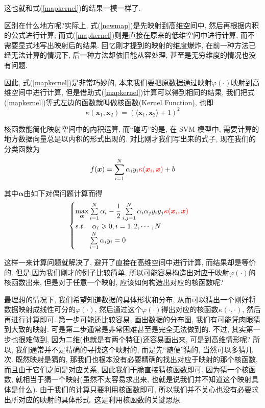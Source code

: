 \documentclass[a4paper,UTF8]{ctexart}
\theoremstyle{plain} \newtheorem{theorem}{定理}[section]
\theoremstyle{plain} \newtheorem{definition}{定义}[section]
\theoremstyle{plain} \newtheorem{lemma}{引理}[section]
\theoremstyle{plain} \newtheorem{proposition}{命题}[section]
\theoremstyle{plain} \newtheorem{example}{例}
\theoremstyle{plain} \newtheorem{remark}{注}
\theoremstyle{plain} \newtheorem{corollary}{推论}[section]
\begin{document}
这也就和式(\ref{mapkernel})的结果一模一样了.

区别在什么地方呢?实际上, 式(\ref{newmap})是先映射到高维空间中, 然后再根据内积的公式进行计算; 而式(\ref{mapkernel})则是直接在原来的低维空间中进行计算, 而不需要显式地写出映射后的结果. 回忆刚才提到的映射的维度爆炸, 在前一种方法已经无法计算的情况下, 后一种方法却依旧能从容处理, 甚至是无穷维度的情况也没有问题.

因此, 式(\ref{mapkernel})是非常巧妙的, 本来我们要把原数据通过映射$\varphi(\cdot)$映射到高维空间中进行计算, 但是借助式(\ref{mapkernel})计算可以得到相同的结果, 我们把式(\ref{mapkernel})等式左边的函数就叫做核函数(Kernel Function), 也即
\begin{equation*}
\kappa (\bm{x}_1,\bm{x}_2) = \left(\langle \bm{x}_1, \bm{x}_2 \rangle + 1 \right)^{2}
\end{equation*}

核函数能简化映射空间中的内积运算, 而“碰巧”的是, 在 SVM 模型中, 需要计算的地方数据向量总是以内积的形式出现的. 对比刚才我们写出来的式子, 现在我们的分类函数为
\begin{equation*}
f(\bm{x}) = \sum_{i=1}^{N} \alpha_{i} y_{i} {\color{red}\kappa (\bm{x}_{i},\bm{x})} + b
\end{equation*}

其中$\bm{\alpha}$由如下对偶问题计算而得
$$
\begin{cases}
\max\limits_{\bm{\alpha}}  \sum\limits_{i=1}^{N} \alpha_{i} - \dfrac{1}{2} \sum\limits_{i,j=1}^{N} \alpha_{i} \alpha_{j} y_{i} y_{j}  {\color{red}\kappa (\bm{x}_{i},\bm{x}) } \\ 
s.t. \quad \alpha_{i} \geqslant 0, i = 1,2,\cdots,N \\ 
\qquad \sum\limits_{i=1}^{N} \alpha_{i} y_{i} = 0
\end{cases}
$$

这样一来计算问题就解决了, 避开了直接在高维空间中进行计算, 而结果却是等价的. 但是,因为我们刚才的例子比较简单, 所以可能容易构造出对应于映射$\varphi(\cdot)$的核函数出来, 但是对于任意一个映射, 应该如何构造出对应的核函数呢?

最理想的情况下, 我们希望知道数据的具体形状和分布, 从而可以猜出一个刚好将数据映射成线性可分的$\varphi(\cdot)$, 然后通过这个$\varphi(\cdot)$得出对应的核函数$\kappa(\cdot,\cdot)$, 然后再进行计算即可. 第一步可能还比较容易, 画出数据的分布图, 我们有可能凭肉眼猜到大致的映射. 可是第二步通常是非常困难甚至是完全无法做到的. 不过, 其实第一步也很难做到, 因为二维(也就是有两个特征)还容易画出来, 可是到高维情形呢? 所以, 我们通常并不是精确的寻找这个映射的, 而是先“随便”猜的, 当然可以多猜几次. 既然映射是猜的, 那我们也根本没有必要精确的找出对应于映射的那个核函数, 而且由于它们之间是对应关系, 因此我们干脆直接猜核函数即可. 因为猜一个核函数, 就相当于猜一个映射(虽然不太容易求出来, 也就是说我们并不知道这个映射具体是什么). 由于我们的计算只要利用核函数即可, 所以我们并不关心也没有必要求出所对应的映射的具体形式. 这是利用核函数的关键思想.
\end{document}

